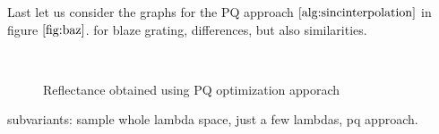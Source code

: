 Last let us consider the graphs for the PQ approach $\ref{alg:sincinterpolation}$ in figure $\ref{fig:baz}$. for blaze grating, differences, but also similarities. 


\begin{figure}[H]
  \centering
~
\caption{Reflectance obtained using PQ optimization apporach}
\label{fig:evaluationdiffshaderpq}
\end{figure}


subvariants: sample whole lambda space, just a few lambdas, pq approach.

